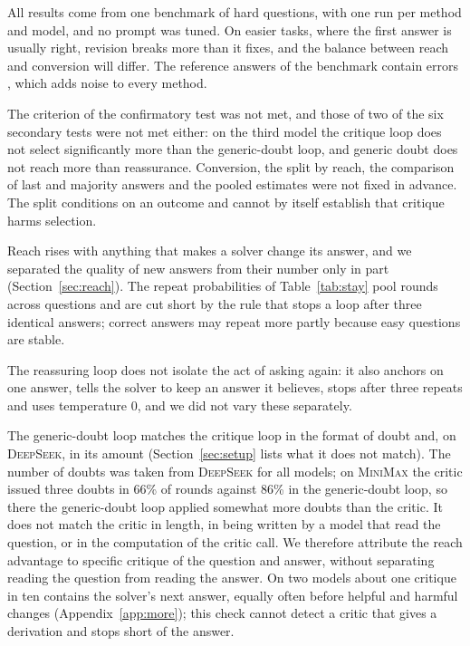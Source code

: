 \documentclass[11pt]{article}
\newcommand{\ds}{\textsc{DeepSeek}}
\newcommand{\mm}{\textsc{MiniMax}}
\begin{document}
All results come from one benchmark of hard questions, with one run per method and model, and no prompt was tuned.
On easier tasks, where the first answer is usually right, revision breaks more than it fixes, and the balance between reach and conversion will differ.
The reference answers of the benchmark contain errors \citep{zhai2026hleverified}, which adds noise to every method.

The criterion of the confirmatory test was not met, and those of two of the six secondary tests were not met either: on the third model the critique loop does not select significantly more than the generic-doubt loop, and generic doubt does not reach more than reassurance.
Conversion, the split by reach, the comparison of last and majority answers and the pooled estimates were not fixed in advance.
The split conditions on an outcome and cannot by itself establish that critique harms selection.

Reach rises with anything that makes a solver change its answer, and we separated the quality of new answers from their number only in part (Section~\ref{sec:reach}).
The repeat probabilities of Table~\ref{tab:stay} pool rounds across questions and are cut short by the rule that stops a loop after three identical answers; correct answers may repeat more partly because easy questions are stable.

The reassuring loop does not isolate the act of asking again: it also anchors on one answer, tells the solver to keep an answer it believes, stops after three repeats and uses temperature 0, and we did not vary these separately.

The generic-doubt loop matches the critique loop in the format of doubt and, on \ds, in its amount (Section~\ref{sec:setup} lists what it does not match).
The number of doubts was taken from \ds{} for all models; on \mm{} the critic issued three doubts in 66\% of rounds against 86\% in the generic-doubt loop, so there the generic-doubt loop applied somewhat more doubts than the critic.
It does not match the critic in length, in being written by a model that read the question, or in the computation of the critic call.
We therefore attribute the reach advantage to specific critique of the question and answer, without separating reading the question from reading the answer.
On two models about one critique in ten contains the solver's next answer, equally often before helpful and harmful changes (Appendix~\ref{app:more}); this check cannot detect a critic that gives a derivation and stops short of the answer.
\end{document}
